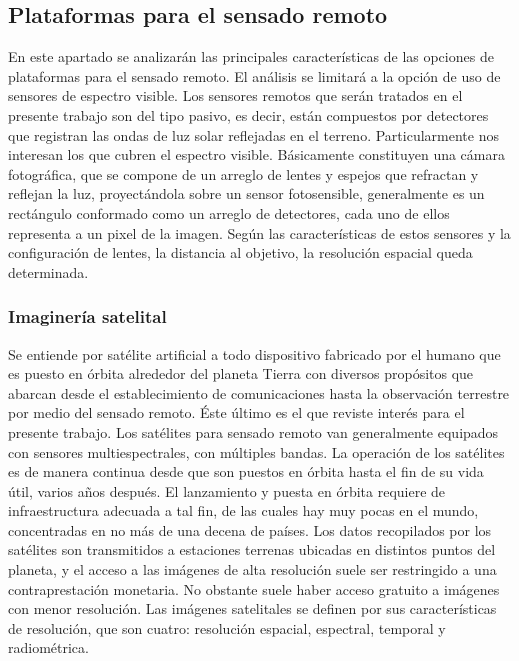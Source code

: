 \subsection{Plataformas para el sensado remoto}
En este apartado se analizarán las principales características de las opciones de plataformas para el sensado remoto. El análisis se limitará a la opción de uso de sensores de espectro visible.
Los sensores remotos que serán tratados en el presente trabajo son del tipo pasivo, es decir, están compuestos por detectores que registran las ondas de luz solar reflejadas en el terreno. Particularmente nos interesan los que cubren el espectro visible. Básicamente constituyen una cámara fotográfica, que se compone de un arreglo de lentes y espejos que refractan y reflejan la luz, proyectándola sobre un sensor fotosensible, generalmente es un rectángulo conformado como un arreglo de detectores, cada uno de ellos representa a un pixel de la imagen. Según las características de estos sensores y la configuración de lentes, la distancia al objetivo, la resolución espacial queda determinada. 
\subsubsection{Imaginería satelital}
Se entiende por satélite artificial a todo dispositivo fabricado por el humano que es puesto en órbita alrededor del planeta Tierra con diversos propósitos que abarcan desde el establecimiento de comunicaciones hasta la observación terrestre por medio del sensado remoto. Éste último es el que reviste interés para el presente trabajo. Los satélites para sensado remoto van generalmente equipados con sensores multiespectrales, con múltiples bandas. La operación de los satélites es de manera continua desde que son puestos en órbita hasta el fin de su vida útil, varios años después. El lanzamiento y puesta en órbita requiere de infraestructura adecuada a tal fin, de las cuales hay muy pocas en el mundo, concentradas en no más de una decena de países. Los datos recopilados por los satélites son transmitidos a estaciones terrenas ubicadas en distintos puntos del planeta, y el acceso a las imágenes de alta resolución suele ser restringido a una contraprestación monetaria. No obstante suele haber acceso gratuito a imágenes con menor resolución. Las imágenes satelitales se definen por sus características de resolución, que son cuatro: resolución espacial, espectral, temporal y radiométrica.

